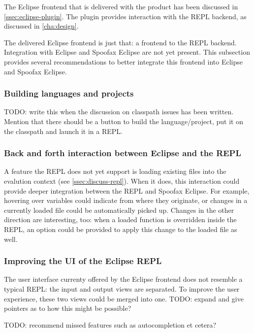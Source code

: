 The Eclipse frontend that is delivered with the product has been discussed in
\cref{ssec:eclipse-plugin}. The plugin provides interaction with the REPL
backend, as discussed in \cref{cha:design}.

The delivered Eclipse frontend is just that: a frontend to the REPL backend.
Integration with Eclipse and Spoofax Eclipse are not yet present. This
subsection provides several recommendations to better integrate this frontend
into Eclipse and Spoofax Eclipse.

\subsubsection{Building languages and projects}

TODO: write this when the discussion on classpath issues has been written.
Mention that there should be a button to build the language/project, put it on
the classpath and launch it in a REPL.

\subsubsection{Back and forth interaction between Eclipse and the REPL}

A feature the REPL does not yet support is loading existing files into the
evalution context (see \cref{ssec:discuss-repl}). When it does, this interaction
could provide deeper integration between the REPL and Spoofax Eclipse. For
example, hovering over variables could indicate from where they originate, or
changes in a currently loaded file could be automatically picked up. Changes in
the other direction are interesting, too: when a loaded function is overridden
inside the REPL, an option could be provided to apply this change to the loaded
file as well.

\subsubsection{Improving the UI of the Eclipse REPL}

The user interface currenty offered by the Eclipse frontend does not resemble a
typical REPL: the input and output views are separated. To improve the user
experience, these two views could be merged into one. TODO: expand and give
pointers as to how this might be possible?

TODO: recommend missed features such as autocompletion et cetera?

